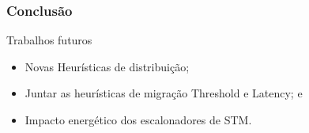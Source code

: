 \documentclass[10pt, pdf,xcolor=pdftex,dvipsnames,table]{beamer}
\begin{document}
\begin{frame} \frametitle{Conclusão}
    \begin{block}{Trabalhos futuros}
        \begin{itemize}
        	\item Novas Heurísticas de distribuição;
        	\item Juntar as heurísticas de migração Threshold e Latency; e
        	\item Impacto energético dos escalonadores de STM.
        \end{itemize}
    \end{block}
\end{frame}

\maketitle
\end{document}
